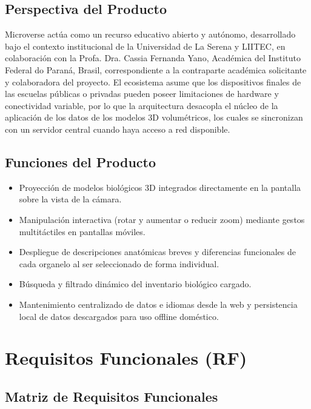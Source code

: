 \documentclass[11pt,a4paper]{article}
\begin{document}
\subsection{Perspectiva del Producto}
Microverse actúa como un recurso educativo abierto y autónomo, desarrollado bajo el contexto institucional de la Universidad de La Serena y LIITEC, en colaboración con la Profa. Dra. Cassia Fernanda Yano, Académica del Instituto Federal do Paraná, Brasil, correspondiente a la contraparte académica solicitante y colaboradora del proyecto. El ecosistema asume que los dispositivos finales de las escuelas públicas o privadas pueden poseer limitaciones de hardware y conectividad variable, por lo que la arquitectura desacopla el núcleo de la aplicación de los datos de los modelos 3D volumétricos, los cuales se sincronizan con un servidor central cuando haya acceso a red disponible.

\subsection{Funciones del Producto}
\begin{itemize}
    \item Proyección de modelos biológicos 3D integrados directamente en la pantalla sobre la vista de la cámara.
    \item Manipulación interactiva (rotar y aumentar o reducir zoom) mediante gestos multitáctiles en pantallas móviles.
    \item Despliegue de descripciones anatómicas breves y diferencias funcionales de cada organelo al ser seleccionado de forma individual.
    \item Búsqueda y filtrado dinámico del inventario biológico cargado.
    \item Mantenimiento centralizado de datos e idiomas desde la web y persistencia local de datos descargados para uso offline doméstico.
    \end{itemize}
\newpage
\section{Requisitos Funcionales (RF)}
\subsection{Matriz de Requisitos Funcionales}
\end{document}
